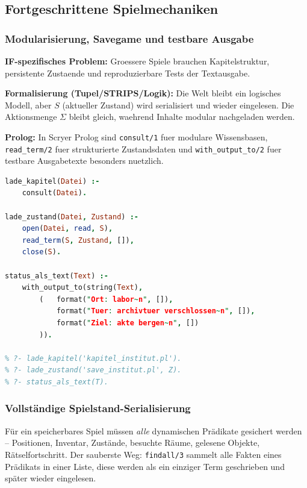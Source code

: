 \documentclass[parskip=half,a4paper,11pt]{scrreprt}
\begin{document}
\subsection{Fortgeschrittene Spielmechaniken}

\subsubsection{Modularisierung, Savegame und testbare Ausgabe}

\textbf{IF-spezifisches Problem:} Groessere Spiele brauchen Kapitelstruktur, persistente Zustaende und reproduzierbare Tests der Textausgabe.

\textbf{Formalisierung (Tupel/STRIPS/Logik):} Die Welt bleibt ein logisches Modell, aber $S$ (aktueller Zustand) wird serialisiert und wieder eingelesen. Die Aktionsmenge $\Sigma$ bleibt gleich, waehrend Inhalte modular nachgeladen werden.

\textbf{Prolog:} In Scryer Prolog sind \texttt{consult/1} fuer modulare Wissensbasen, \texttt{read\_term/2} fuer strukturierte Zustandsdaten und \texttt{with\_output\_to/2} fuer testbare Ausgabetexte besonders nuetzlich.

\begin{lstlisting}[language=Prolog,caption={}]
lade_kapitel(Datei) :-
    consult(Datei).

lade_zustand(Datei, Zustand) :-
    open(Datei, read, S),
    read_term(S, Zustand, []),
    close(S).

status_als_text(Text) :-
    with_output_to(string(Text),
        (   format("Ort: labor~n", []),
            format("Tuer: archivtuer verschlossen~n", []),
            format("Ziel: akte bergen~n", [])
        )).

% ?- lade_kapitel('kapitel_institut.pl').
% ?- lade_zustand('save_institut.pl', Z).
% ?- status_als_text(T).
\end{lstlisting}

\subsubsection{Vollständige Spielstand-Serialisierung}

Für ein speicherbares Spiel müssen \textit{alle} dynamischen Prädikate gesichert werden – Positionen, Inventar, Zustände, besuchte Räume, gelesene Objekte, Rätselfortschritt. Der sauberste Weg: \texttt{findall/3} sammelt alle Fakten eines Prädikats in einer Liste, diese werden als ein einziger Term geschrieben und später wieder eingelesen.
\end{document}
